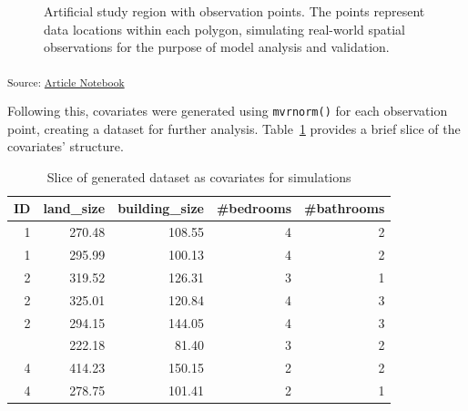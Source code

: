 \documentclass[
  default,
]{sn-jnl}
\begin{document}
\label{cell-fig-pointsonmap}
\begin{figure}[H]


\caption{\label{fig-pointsonmap}Artificial study region with observation
points. The points represent data locations within each polygon,
simulating real-world spatial observations for the purpose of model
analysis and validation.}

\end{figure}%

\textsubscript{Source:
\href{https://indiraputeri-phd.github.io/CAR_simcomp/manuscript.qmd.html}{Article
Notebook}}

Following this, covariates were generated using \texttt{mvrnorm()} for
each observation point, creating a dataset for further analysis.
Table~\ref{tbl-covrstr} provides a brief slice of the covariates'
structure.

\begingroup\fontsize{9}{11}\selectfont

\begin{longtable}[t]{rrrrr}

\caption{\label{tbl-covrstr}Slice of generated dataset as covariates for
simulations}

\tabularnewline

\toprule
ID & land\_size & building\_size & \#bedrooms & \#bathrooms\\
\midrule
1 & 270.48 & 108.55 & 4 & 2\\
1 & 295.99 & 100.13 & 4 & 2\\
2 & 319.52 & 126.31 & 3 & 1\\
2 & 325.01 & 120.84 & 4 & 3\\
2 & 294.15 & 144.05 & 4 & 3\\
\addlinespace
3 & 222.18 & 81.40 & 3 & 2\\
4 & 414.23 & 150.15 & 2 & 2\\
4 & 278.75 & 101.41 & 2 & 1\\
\bottomrule

\end{longtable}
\end{document}
